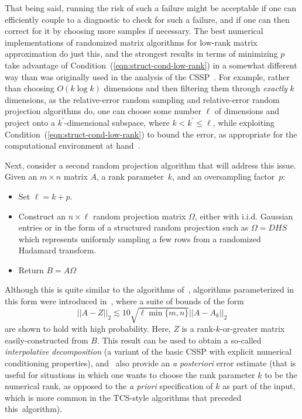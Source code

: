 \documentclass[twoside]{article}
\begin{document}
That being said, running the risk of such a failure might be acceptable if
one can efficiently couple to a diagnostic to check for such a 
failure, and if one can then correct for it by choosing more 
samples if necessary.
The best numerical implementations of randomized matrix algorithms for 
low-rank matrix approximation do just this, and the strongest results in 
terms of minimizing $p$ take advantage of 
Condition~(\ref{eqn:struct-cond-low-rank}) in a somewhat different way than 
was originally used in the analysis of the CSSP~\cite{HMT09_SIREV}.
For example, rather than choosing $O(k \log k)$ dimensions and then 
filtering them through \emph{exactly} $k$ dimensions, as the relative-error 
random sampling and relative-error random projection algorithms do, one can 
choose some number $\ell$ of dimensions and project onto a 
$k^{\prime}$-dimensional subspace, where $k < k^{\prime} \le \ell$, while 
exploiting Condition~(\ref{eqn:struct-cond-low-rank}) to bound the error, as 
appropriate for the computational environment at hand~\cite{HMT09_SIREV}.

Next, consider a second random projection algorithm that will address this 
issue.
Given an $m \times n$ matrix $A$, a rank parameter~$k$, and an oversampling
factor~$p$:
\begin{itemize}
\item
Set $\ell = k + p$.
\item
Construct an $n \times \ell$ random projection matrix $\Omega$, either with 
i.i.d.  Gaussian entries or in the form of a structured random projection 
such as $\Omega = DHS$ which represents uniformly sampling a few rows from 
a randomized Hadamard transform.
\item
Return $B = A \Omega$
\end{itemize}
Although this is quite similar to the algorithms of~\cite{PRTV00,Sarlos06},
algorithms parameterized in this form were introduced 
in~\cite{MRT11,WLRT08,LWFMRT07}, where a suite of bounds of the form
$$
||A-Z||_2 \lesssim 10 \sqrt{\ell \min\{m,n\}}||A-A_k||_2
$$
are shown to hold with high probability.
Here, $Z$ is a rank-$k$-or-greater matrix easily-constructed from $B$.
This result can be used to obtain a so-called \emph{interpolative 
decomposition} (a variant of the basic CSSP with explicit numerical 
conditioning properties), and~\cite{MRT11,WLRT08,LWFMRT07} also provide an 
\emph{a posteriori} error estimate (that is useful for situations in which 
one wants to choose the rank parameter $k$ to be the numerical rank, as 
opposed to the \emph{a priori} specification of $k$ as part of the input, 
which is more common in the TCS-style algorithms that preceded 
this~algorithm).
\end{document}
